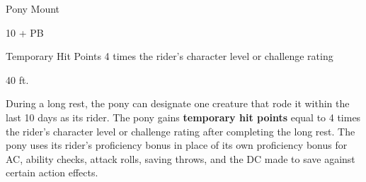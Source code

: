 \documentclass[letterpaper,twocolumn,openany,nodeprecatedcode]{dndbook}
\begin{document}
\begin{DndMonster}[float*=b,width=\textwidth + 8pt]{Pony Mount}
  \begin{multicols}{2}

    \DndMonsterLine
    \begin {CustomBasics}
      \item[\armorclassname] 10 + PB
      \item[Temporary Hit Points] 4 times the rider's character level or challenge rating
      \item[\hitpointsname]  
      \item[\speedname] 40 ft.
    \end {CustomBasics}
    \DndMonsterLine

    \DndMonsterAbilityScores[
        str = 15,
        dex = 10,
        con = 13,
        int = 2,
        wis = 11,
        cha = 7,
      ]

    \DndMonsterDetails[
        senses = {passive Perception 10},
        languages = {-},
        challenge = 1/8,
      ]

    During a long rest, the pony can designate one creature that rode it within the last 10 days as its rider. The pony gains \textbf{temporary hit points} equal to 4 times the rider’s character level or challenge rating after completing the long rest. The pony uses its rider’s proficiency bonus in place of its own proficiency bonus for AC, ability checks, attack rolls, saving throws, and the DC made to save against certain action effects.


    \DndMonsterAttack[
      name=Combat Stomp,
      distance=melee, %
      mod={+2 + PB},
      dmg=\DndDice{2d4 + 2},
      dmg-type=bludgeoning,
      extra={. If the target is a Medium or smaller creature, it must succeed on a DC 10 + PB Strength saving throw or be knocked prone.}
    ]


\end{multicols}
\end{DndMonster}
\end{document}
